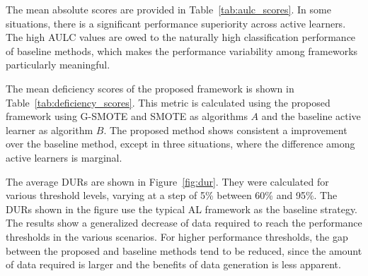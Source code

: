 \documentclass[parskip=full]{scrartcl}
\begin{document}

The mean absolute scores are provided in Table~\ref{tab:aulc_scores}. In some
situations, there is a significant performance superiority across active
learners. The high AULC values are owed to the naturally high classification
performance of baseline methods, which makes the performance variability among
frameworks particularly meaningful. 


The mean deficiency scores of the proposed framework is shown in
Table~\ref{tab:deficiency_scores}. This metric is calculated using the proposed
framework using G-SMOTE and SMOTE as algorithms $A$ and the baseline active
learner as algorithm $B$. The proposed method shows consistent a improvement
over the baseline method, except in three situations, where the difference
among active learners is marginal.


The average DURs are shown in Figure~\ref{fig:dur}. They were calculated for
various threshold levels, varying at a step of 5\% between 60\% and 95\%. The
DURs shown in the figure use the typical AL framework as the baseline strategy.
The results show a generalized decrease of data required to reach the
performance thresholds in the various scenarios. For higher performance
thresholds, the gap between the proposed and baseline methods tend to be
reduced, since the amount of data required is larger and the benefits of data
generation is less apparent.
\end{document}
